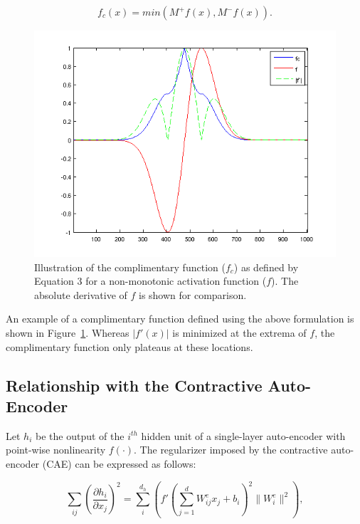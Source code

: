 \documentclass{article} %
\begin{document}
\begin{equation} 
f_c(x) = min(M^+f(x),M^-f(x)).
\end{equation} 

\begin{figure}
\centering 
\includegraphics[scale=0.43]{./diff_cc.png}
\caption{Illustration of the complimentary function ($f_c$) as defined by Equation 3 for a non-monotonic activation function ($f$). The absolute derivative of $f$ is shown for comparison.}  
\label{fig:diff_cc}
\end{figure} 

An example of a complimentary function defined using the above formulation is shown in Figure~\ref{fig:diff_cc}. Whereas $|f'(x)|$ is minimized at the extrema of $f$, the complimentary function only plateaus at these locations.

\subsection{Relationship with the Contractive Auto-Encoder} 
Let $h_i$ be the output of the $i^{th}$ hidden unit of a single-layer auto-encoder with point-wise nonlinearity $f(\cdot)$. The regularizer imposed by the contractive auto-encoder (CAE) can be expressed as follows: 

\begin{equation}
\nonumber
\sum_{ij} \left(\frac{\partial h_i}{\partial x_j} \right)^2 = \sum_i ^{d_h} \left(f'(\sum_{j=1}^d W^e_{ij}x_j + b_i)^2 \| W^e_i \| ^2 \right),
\end{equation}  
 
\end{document}
